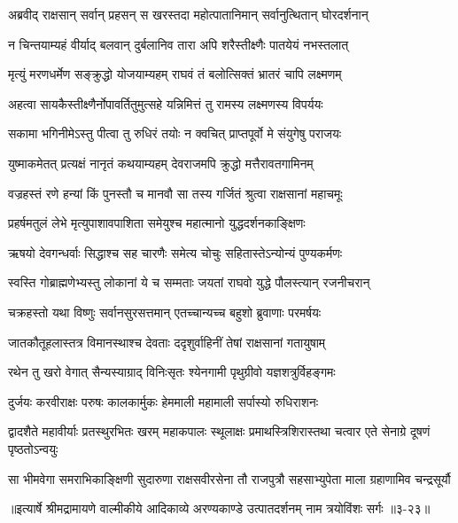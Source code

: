 \twolineshloka
{अब्रवीद् राक्षसान् सर्वान् प्रहसन् स खरस्तदा}
{महोत्पातानिमान् सर्वानुत्थितान् घोरदर्शनान्} %

\twolineshloka
{न चिन्तयाम्यहं वीर्याद् बलवान् दुर्बलानिव}
{तारा अपि शरैस्तीक्ष्णैः पातयेयं नभस्तलात्} %

\twolineshloka
{मृत्युं मरणधर्मेण सङ्क्रुद्धो योजयाम्यहम्}
{राघवं तं बलोत्सिक्तं भ्रातरं चापि लक्ष्मणम्} %

\twolineshloka
{अहत्वा सायकैस्तीक्ष्णैर्नोपावर्तितुमुत्सहे}
{यन्निमित्तं तु रामस्य लक्ष्मणस्य विपर्ययः} %

\twolineshloka
{सकामा भगिनीमेऽस्तु पीत्वा तु रुधिरं तयोः}
{न क्वचित् प्राप्तपूर्वो मे संयुगेषु पराजयः} %

\twolineshloka
{युष्माकमेतत् प्रत्यक्षं नानृतं कथयाम्यहम्}
{देवराजमपि क्रुद्धो मत्तैरावतगामिनम्} %

\twolineshloka
{वज्रहस्तं रणे हन्यां किं पुनस्तौ च मानवौ}
{सा तस्य गर्जितं श्रुत्वा राक्षसानां महाचमूः} %

\twolineshloka
{प्रहर्षमतुलं लेभे मृत्युपाशावपाशिता}
{समेयुश्च महात्मानो युद्धदर्शनकाङ्क्षिणः} %

\twolineshloka
{ऋषयो देवगन्धर्वाः सिद्धाश्च सह चारणैः}
{समेत्य चोचुः सहितास्तेऽन्योन्यं पुण्यकर्मणः} %

\twolineshloka
{स्वस्ति गोब्राह्मणेभ्यस्तु लोकानां ये च सम्मताः}
{जयतां राघवो युद्धे पौलस्त्यान् रजनीचरान्} %

\twolineshloka
{चक्रहस्तो यथा विष्णुः सर्वानसुरसत्तमान्}
{एतच्चान्यच्च बहुशो ब्रुवाणाः परमर्षयः} %

\twolineshloka
{जातकौतूहलास्तत्र विमानस्थाश्च देवताः}
{ददृशुर्वाहिनीं तेषां राक्षसानां गतायुषाम्} %

\twolineshloka
{रथेन तु खरो वेगात् सैन्यस्याग्राद् विनिःसृतः}
{श्येनगामी पृथुग्रीवो यज्ञशत्रुर्विहङ्गमः} %

\twolineshloka
{दुर्जयः करवीराक्षः परुषः कालकार्मुकः}
{हेममाली महामाली सर्पास्यो रुधिराशनः} %

\threelineshloka
{द्वादशैते महावीर्याः प्रतस्थुरभितः खरम्}
{महाकपालः स्थूलाक्षः प्रमाथस्त्रिशिरास्तथा}
{चत्वार एते सेनाग्रे दूषणं पृष्ठतोऽन्वयुः} %

\twolineshloka
{सा भीमवेगा समराभिकाङ्क्षिणी सुदारुणा राक्षसवीरसेना}
{तौ राजपुत्रौ सहसाभ्युपेता माला ग्रहाणामिव चन्द्रसूर्यौ} %


॥इत्यार्षे श्रीमद्रामायणे वाल्मीकीये आदिकाव्ये अरण्यकाण्डे उत्पातदर्शनम् नाम त्रयोविंशः सर्गः ॥३-२३॥
